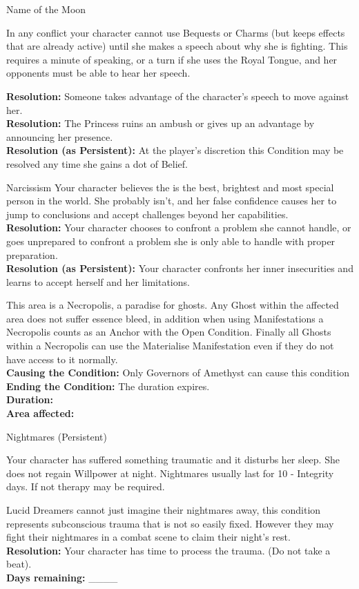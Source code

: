 \documentclass[10pt, frontgrid, backgrid]{flacards}
\begin{document}
\Cond
{Name of the Moon}
{In any conflict your character cannot use Bequests or Charms (but keeps effects that are already active) until she makes a speech about why she is fighting. This requires a minute of speaking, or a turn if she uses the Royal Tongue, and her opponents must be able to hear her speech.

\textbf{Resolution:} Someone takes advantage of the character's speech to move against her.\\
\textbf{Resolution:} The Princess ruins an ambush or gives up an advantage by announcing her presence.\\
\textbf{Resolution (as Persistent):} At the player's discretion this Condition may be resolved any time she gains a dot of Belief. 
}

\Cond
{Narcissism}
{Your character believes the is the best, brightest and most special person in the world. She probably isn't, and her false confidence causes her to jump to conclusions and accept challenges beyond her capabilities. \\
\textbf{Resolution:} Your character chooses to confront a problem she cannot handle, or goes unprepared to confront a problem she is only able to handle with proper preparation.\\
\textbf{Resolution (as Persistent):} Your character confronts her inner insecurities and learns to accept herself and her limitations.
}

{This area is a Necropolis, a paradise for ghosts. Any Ghost within the affected area does not suffer essence bleed, in addition when using Manifestations a Necropolis counts as an Anchor with the Open Condition. Finally all Ghosts within a Necropolis can use the Materialise Manifestation even if they do not have access to it normally. \\

\textbf{Causing the Condition:} Only Governors of Amethyst can cause this condition\\
\textbf{Ending the Condition:} The duration expires. \\
\textbf{Duration:} \fillunderline \\
\textbf{Area affected:} \fillunderline}

\Cond
{Nightmares (Persistent)}
{Your character has suffered something traumatic and it disturbs her sleep. She does not regain Willpower at night. Nightmares usually last for 10 - Integrity days. If not therapy may be required.

Lucid Dreamers cannot just imagine their nightmares away, this condition represents subconscious trauma that is not so easily fixed. However they may fight their nightmares in a combat scene to claim their night's rest. \\

\textbf{Resolution:} Your character has time to process the trauma. (Do not take a beat).\\
\textbf{Days remaining:} \_\_\_\_}
\end{document}
